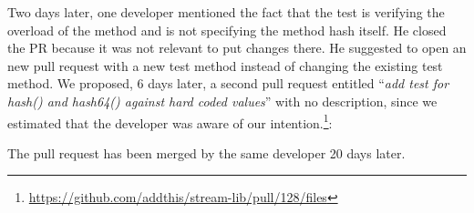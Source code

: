 \documentclass[table,xcdraw,smallextended]{svjour3}
\begin{document}
Two days later, one developer mentioned the fact that the test is verifying the overload of the method and is not specifying the method hash itself. He closed the PR because it was not relevant to put changes there. He suggested to open an new pull request with a new test method instead of changing the existing test method. We proposed, 6 days later, a second pull request entitled ``\emph{add test for hash() and hash64() against hard coded values}'' with no description, since we estimated that the developer was aware of our intention.\footnote{\url{https://github.com/addthis/stream-lib/pull/128/files}}:
\begin{figure}[H]
    \centering{}
\end{figure}

The pull request has been merged by the same developer 20 days later.
\end{document}
